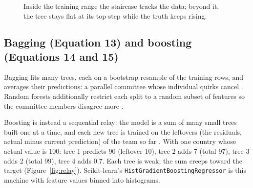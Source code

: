 \documentclass[11pt]{article}
\begin{document}
\begin{figure}[ht]
\centering
{}
\caption{Inside the training range the staircase tracks the data; beyond
it, the tree stays flat at its top step while the truth keeps rising.}
\label{fig:staircase}
\end{figure}

\subsection{Bagging (Equation 13) and boosting (Equations 14 and 15)}

Bagging fits many trees, each on a bootstrap resample of the training
rows, and averages their predictions: a parallel committee whose
individual quirks cancel \cite{breiman1996bagging}. Random forests
additionally restrict each split to a random subset of features so the
committee members disagree more \cite{breiman2001random}.

Boosting is instead a sequential relay: the model is a sum of many small
trees built one at a time, and each new tree is trained on the leftovers
(the residuals, actual minus current prediction) of the team so far
\cite{friedman2001greedy}. With one country whose actual value is 100:
tree 1 predicts 90 (leftover 10), tree 2 adds 7 (total 97), tree 3 adds 2
(total 99), tree 4 adds 0.7. Each tree is weak; the sum creeps toward the
target (Figure~\ref{fig:relay}). Scikit-learn's
\texttt{HistGradientBoostingRegressor} is this machine with feature
values binned into histograms.
\end{document}
